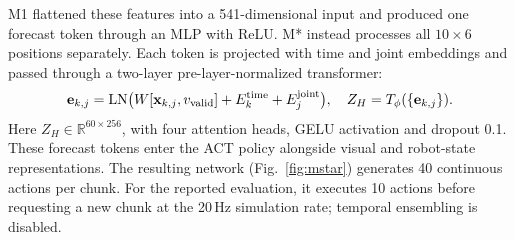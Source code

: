 \documentclass[conference]{IEEEtran}
\begin{document}
M1 flattened these features into a 541-dimensional input and produced one forecast token through an MLP with ReLU. M* instead processes all $10\times 6$ positions separately. Each token is projected with time and joint embeddings and passed through a two-layer pre-layer-normalized transformer:
\begin{equation}
\mathbf e_{k,j}=\mathrm{LN}
\bigl(W[\mathbf x_{k,j},v_{\rm valid}]
 + E^{\rm time}_{k}+E^{\rm joint}_{j}\bigr),
\quad
Z_H=T_{\phi}(\{\mathbf e_{k,j}\}) .
\label{eq:tokens}
\end{equation}
Here $Z_H\in\mathbb R^{60\times256}$, with four attention heads, GELU activation and dropout 0.1. These forecast tokens enter the ACT policy alongside visual and robot-state representations. The resulting network (Fig.~\ref{fig:mstar}) generates 40 continuous actions per chunk. For the reported evaluation, it executes 10 actions before requesting a new chunk at the 20\,Hz simulation rate; temporal ensembling is disabled.
\end{document}
